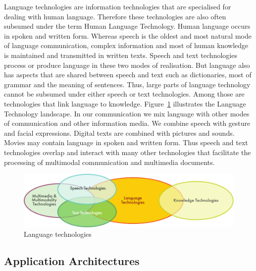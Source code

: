 \begin{multicols}{2}
   Language technologies are information technologies that are specialised for dealing with human language. Therefore these technologies are also often subsumed under the term Human Language Technology. Human language occurs in spoken and written form. Whereas speech is the oldest and most natural mode of language communication, complex information and most of human knowledge is maintained and transmitted in written texts. Speech and text technologies process or produce language in these two modes of realisation. But language also has aspects that are shared between speech and text such as dictionaries, most of grammar and the meaning of sentences. Thus, large parts of language technology cannot be subsumed under either speech or text technologies. Among those are technologies that link language to knowledge. Figure~\ref{fig:ltincontext_en} illustrates the Language Technology landscape. In our communication we mix language with other modes of communication and other information media. We combine speech with gesture and facial expressions. Digital texts are combined with pictures and sounds. Movies may contain language in spoken and written form. Thus speech and text technologies overlap and interact with many other technologies that facilitate the processing of multimodal communication and multimedia documents. 
\begin{figure}[htb]
  \center
  \includegraphics[width=\textwidth]{../_media/english/language_technologies}
  \caption{Language technologies}
  \label{fig:ltincontext_en}
\end{figure}

\subsection{Application Architectures}


\end{multicols}
